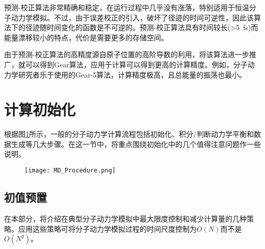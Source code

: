 预测-校正算法非常精确和稳定，在运行过程中几乎没有涨落，特别适用于恒温分子动力学模拟。不过，由于误差校正的引入，破坏了径迹的时间可逆性，因此该算法下的径迹随时间变化的函数是不可逆的。预测-校正算法具有时间较长(>5~\textrm{fs})而能量漂移较小的特点，代价是需要更多的存储空间。

由于预测-校正算法的高精度源自原子位置的高阶导数的利用，将该算法进一步推广，就可以得到\textrm{Gear}算法\cite{ODE_1971}，应用于计算可以得到更高的计算精度。例如，分子动力学研究者乐于使用的\textrm{Gear}-5算法，计算精度极高，且总能量的振荡也最小。

\section{计算初始化}
根据图\ref{MD_Procedure}所示，一般的分子动力学计算流程包括初始化、积分/判断动力学平衡和数据生成等几大步骤。在这一节中，将重点围绕初始化中的几个值得注意问题作一些说明。
\begin{figure}[h!]
\centering
\vspace*{-0.1in}
\texttt{[image: MD\_Procedure.png]}
\caption{\fontsize{7.2pt}{4.2pt}\selectfont{典型的分子动力学计算流程示意.}}%
\label{MD_Procedure}
\end{figure}
\subsection{初值预置}
在本部分，将介绍在典型分子动力学模拟中最大限度控制和减少计算量的几种策略。应用这些策略可将分子动力学模拟过程的时间尺度控制为$O(N)$而不是$O(N^2)$。
